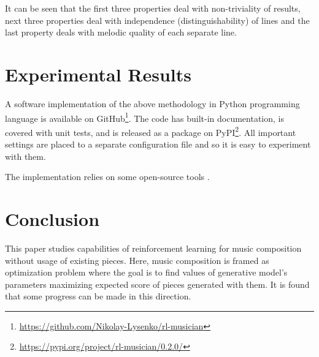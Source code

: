 \documentclass{article}
\begin{document}
It can be seen that the first three properties deal with non-triviality of results, next three properties deal with independence (distinguishability) of lines and the last property deals with melodic quality of each separate line. 


\section{Experimental Results}
\label{sec:results}

A software implementation of the above methodology in Python programming language is available on GitHub\footnote{\url{https://github.com/Nikolay-Lysenko/rl-musician}}. The code has built-in documentation, is covered with unit tests, and is released as a package on PyPI\footnote{\url{https://pypi.org/project/rl-musician/0.2.0/}}. All important settings are placed to a separate configuration file and so it is easy to experiment with them.

The implementation relies on some open-source tools \cite{brockman2016openai,chollet2015keras,oliphant2006guide,raffel2014intuitive}.





\section{Conclusion}
\label{sec:conclusion}


This paper studies capabilities of reinforcement learning for music composition without usage of existing pieces. Here, music composition is framed as optimization problem where the goal is to find values of generative model's parameters maximizing expected score of pieces generated with them. It is found that some progress can be made in this direction.
\end{document}
